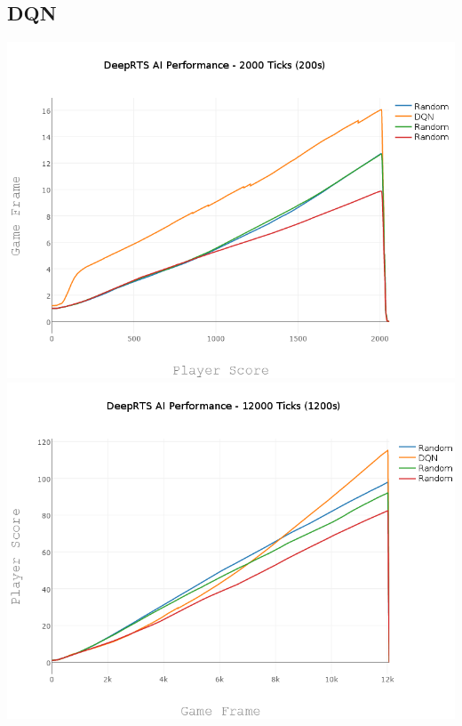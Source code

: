 \documentclass[fleqn,10pt]{SelfArx} %
\begin{document}
\subsection{DQN}
\includegraphics[width=\linewidth]{3000.png}
\includegraphics[width=\linewidth]{12000.png}
\end{document}
